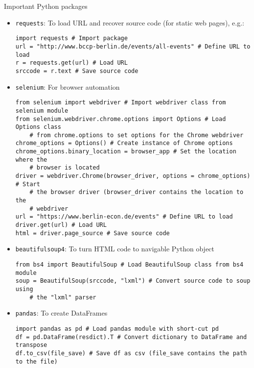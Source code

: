 \begin{frame}{Important Python packages}
\begin{itemize}
	\item \texttt{requests}: To load URL and recover source code (for static web pages), e.g.:
\begin{verbatim}
import requests # Import package
url = "http://www.bccp-berlin.de/events/all-events" # Define URL to load
r = requests.get(url) # Load URL
srccode = r.text # Save source code
\end{verbatim}

\framebreak

	\item \texttt{selenium}: For browser automation
\begin{verbatim}
from selenium import webdriver # Import webdriver class from selenium module
from selenium.webdriver.chrome.options import Options # Load Options class 
    # from chrome.options to set options for the Chrome webdriver
chrome_options = Options() # Create instance of Chrome options
chrome_options.binary_location = browser_app # Set the location where the
    # browser is located
driver = webdriver.Chrome(browser_driver, options = chrome_options) # Start
    # the browser driver (browser_driver contains the location to the
    # webdriver
url = "https://www.berlin-econ.de/events" # Define URL to load
driver.get(url) # Load URL
html = driver.page_source # Save source code
\end{verbatim}

\framebreak

	\item \texttt{beautifulsoup4}: To turn HTML code to navigable Python object
\begin{verbatim}
from bs4 import BeautifulSoup # Load BeautifulSoup class from bs4 module
soup = BeautifulSoup(srccode, "lxml") # Convert source code to soup using 
    # the "lxml" parser
\end{verbatim}

	\item \texttt{pandas}: To create DataFrames
\begin{verbatim}
import pandas as pd # Load pandas module with short-cut pd
df = pd.DataFrame(resdict).T # Convert dictionary to DataFrame and transpose
df.to_csv(file_save) # Save df as csv (file_save contains the path to the file)
\end{verbatim}
\end{itemize}

\end{frame}